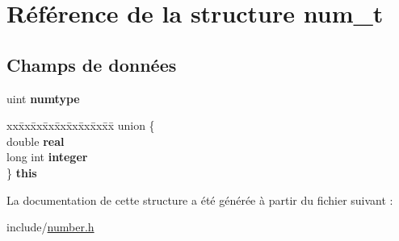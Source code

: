 \hypertarget{structnum__t}{}\section{Référence de la structure num\+\_\+t}
\label{structnum__t}
\subsection*{Champs de données}
\begin{DoxyCompactItemize}
\item 
uint {\bfseries numtype}\hypertarget{structnum__t_adb4ea5cacb51e0ecb72c166358868b05}{}\label{structnum__t_adb4ea5cacb51e0ecb72c166358868b05}

\item 
\begin{tabbing}
xx\=xx\=xx\=xx\=xx\=xx\=xx\=xx\=xx\=\kill
union \{\\
\>double {\bfseries real}\\
\>long int {\bfseries integer}\\
\} {\bfseries this}\hypertarget{structnum__t_a3585eefc338ec701eb6f57b1c2391cfd}{}\label{structnum__t_a3585eefc338ec701eb6f57b1c2391cfd}
\\

\end{tabbing}\end{DoxyCompactItemize}


La documentation de cette structure a été générée à partir du fichier suivant \+:\begin{DoxyCompactItemize}
\item 
include/\hyperlink{number_8h}{number.\+h}\end{DoxyCompactItemize}
